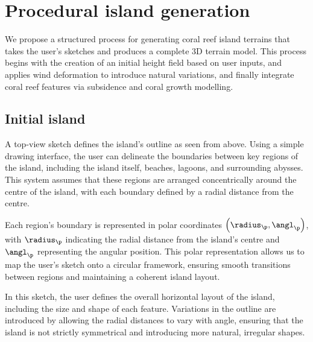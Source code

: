 
\section{Procedural island generation}
\label{sec:coral-island-example-generation}

We propose a structured process for generating coral reef island terrains that takes the user's sketches and produces a complete 3D terrain model. This process begins with the creation of an initial height field based on user inputs, and applies wind deformation to introduce natural variations, and finally integrate coral reef features via subsidence and coral growth modelling.

\subsection{Initial island}

A top-view sketch defines the island's outline as seen from above. Using a simple drawing interface, the user can delineate the boundaries between key regions of the island, including the island itself, beaches, lagoons, and surrounding abysses. This system assumes that these regions are arranged concentrically around the centre of the island, with each boundary defined by a radial distance from the centre.

Each region's boundary is represented in polar coordinates $\left(\radius_\p, \angl_\p\right)$, with $\radius_\p$ indicating the radial distance from the island's centre and $\angl_\p$ representing the angular position. This polar representation allows us to map the user's sketch onto a circular framework, ensuring smooth transitions between regions and maintaining a coherent island layout.

In this sketch, the user defines the overall horizontal layout of the island, including the size and shape of each feature. Variations in the outline are introduced by allowing the radial distances to vary with angle, ensuring that the island is not strictly symmetrical and introducing more natural, irregular shapes.


